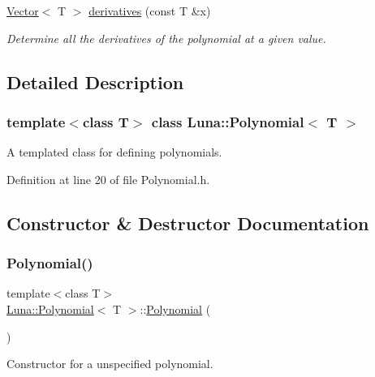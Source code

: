 \begin{DoxyCompactItemize}
\hyperlink{classLuna_1_1Vector}{Vector}$<$ T $>$ \hyperlink{classLuna_1_1Polynomial_a79cf4744896e8c226359f6258e621846}{derivatives} (const T \&x)
\begin{DoxyCompactList}\small\item\em Determine all the derivatives of the polynomial at a given value. \end{DoxyCompactList}\end{DoxyCompactItemize}


\subsection{Detailed Description}
\subsubsection*{template$<$class T$>$\newline
class Luna\+::\+Polynomial$<$ T $>$}

A templated class for defining polynomials. 

Definition at line 20 of file Polynomial.\+h.



\subsection{Constructor \& Destructor Documentation}
\mbox{\label{classLuna_1_1Polynomial_a8b01fe12cd6dcc7191b462d7108ba810}} 
\subsubsection{\texorpdfstring{Polynomial()}{Polynomial()}\hspace{0.1cm}{\footnotesize\ttfamily [1/3]}}
{\footnotesize\ttfamily template$<$class T$>$ \\
\hyperlink{classLuna_1_1Polynomial}{Luna\+::\+Polynomial}$<$ T $>$\+::\hyperlink{classLuna_1_1Polynomial}{Polynomial} (\begin{DoxyParamCaption}{ }\end{DoxyParamCaption})\hspace{0.3cm}{\ttfamily [inline]}}



Constructor for a unspecified polynomial. 



